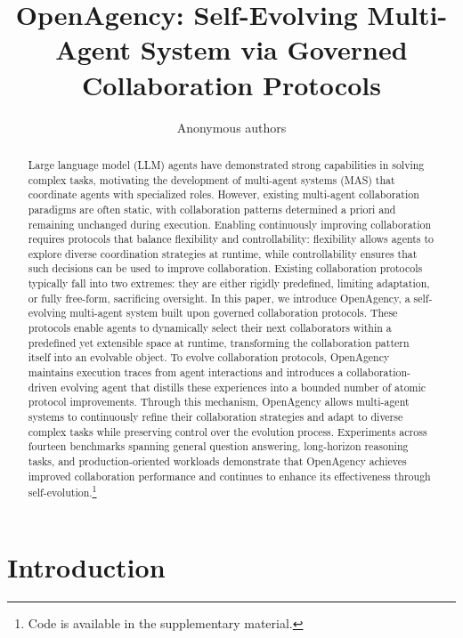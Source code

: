 \documentclass{article} %
\title{OpenAgency: Self-Evolving Multi-Agent System via Governed Collaboration Protocols}
\author{Anonymous authors}
\begin{document}
\maketitle

\begin{abstract}
Large language model (LLM) agents have demonstrated strong capabilities in solving complex tasks, motivating the development of multi-agent systems (MAS) that coordinate agents with specialized roles. However, existing multi-agent collaboration paradigms are often static, with collaboration patterns determined a priori and remaining unchanged during execution. Enabling continuously improving collaboration requires protocols that balance flexibility and controllability: flexibility allows agents to explore diverse coordination strategies at runtime, while controllability ensures that such decisions can be used to improve collaboration.
Existing collaboration protocols typically fall into two extremes: they are either rigidly predefined, limiting adaptation, or fully free-form, sacrificing oversight. In this paper, we introduce OpenAgency, a self-evolving multi-agent system built upon governed collaboration protocols. These protocols enable agents to dynamically select their next collaborators within a predefined yet extensible space at runtime, transforming the collaboration pattern itself into an evolvable object.
To evolve collaboration protocols, OpenAgency maintains execution traces from agent interactions and introduces a collaboration-driven evolving agent that distills these experiences into a bounded number of atomic protocol improvements. Through this mechanism, OpenAgency allows multi-agent systems to continuously refine their collaboration strategies and adapt to diverse complex tasks while preserving control over the evolution process.
Experiments across fourteen benchmarks spanning general question answering, long-horizon reasoning tasks, and production-oriented workloads demonstrate that OpenAgency achieves improved collaboration performance and continues to enhance its effectiveness through self-evolution.\footnote{Code is available in the supplementary material.}
\end{abstract}

\section{Introduction}

\end{document}

